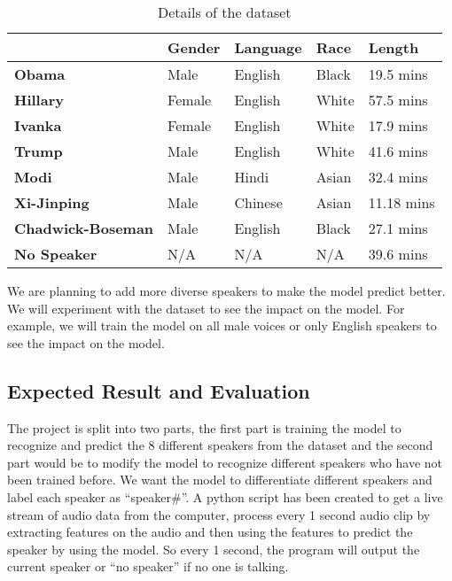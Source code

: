 \documentclass[10pt,twocolumn,letterpaper]{article}
\begin{document}
\begin{table}[h]
    \begin{tabular}{l|l|l|l|l|}
    \cline{2-5}
                                                    & \textbf{Gender} & \textbf{Language} & \textbf{Race} & \textbf{Length} \\ \hline
    \multicolumn{1}{|l|}{\textbf{Obama}}            & Male            & English           & Black         & 19.5 mins       \\ \hline
    \multicolumn{1}{|l|}{\textbf{Hillary}}          & Female          & English           & White         & 57.5 mins       \\ \hline
    \multicolumn{1}{|l|}{\textbf{Ivanka}}           & Female          & English           & White         & 17.9 mins       \\ \hline
    \multicolumn{1}{|l|}{\textbf{Trump}}            & Male            & English           & White         & 41.6 mins       \\ \hline
    \multicolumn{1}{|l|}{\textbf{Modi}}             & Male            & Hindi             & Asian         & 32.4 mins       \\ \hline
    \multicolumn{1}{|l|}{\textbf{Xi-Jinping}}       & Male            & Chinese           & Asian         & 11.18 mins      \\ \hline
    \multicolumn{1}{|l|}{\textbf{Chadwick-Boseman}} & Male            & English           & Black         & 27.1 mins       \\ \hline
    \multicolumn{1}{|l|}{\textbf{No Speaker}}       & N/A             & N/A               & N/A           & 39.6 mins       \\ \hline
    \end{tabular}
    \caption{Details of the dataset}
    \label{Dataset}
\end{table}

We are planning to add more diverse speakers to make the model predict better. We will experiment with the dataset to see the impact on the model. For example, we will train the model on all male voices or only English speakers to see the impact on the model. 

\subsection{Expected Result and Evaluation}

The project is split into two parts, the first part is training the model to recognize and predict the 8 different speakers from the dataset and the second part would be to modify the model to recognize different speakers who have not been trained before.  We want the model to differentiate different speakers and label each speaker as “speaker\#”. A python script has been created to get a live stream of audio data from the computer, process every 1 second audio clip by extracting features on the audio and then using the features to predict the speaker by using the model. So every 1 second, the program will output the current speaker or “no speaker” if no one is talking.   
\end{document}
